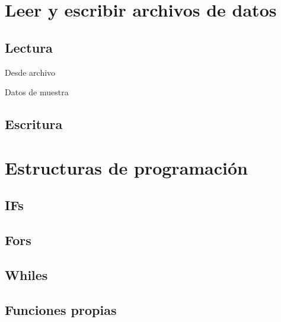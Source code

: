 \documentclass[]{article}
\begin{document}
\section{Leer y escribir archivos de
datos}\label{leer-y-escribir-archivos-de-datos}

\subsection{Lectura}\label{lectura}

Desde archivo

Datos de muestra

\subsection{Escritura}\label{escritura}

\section{Estructuras de programación}\label{estructuras-de-programacion}

\subsection{IFs}\label{ifs}

\subsection{Fors}\label{fors}

\subsection{Whiles}\label{whiles}

\subsection{Funciones propias}\label{funciones-propias}

\printbibliography
\end{document}
